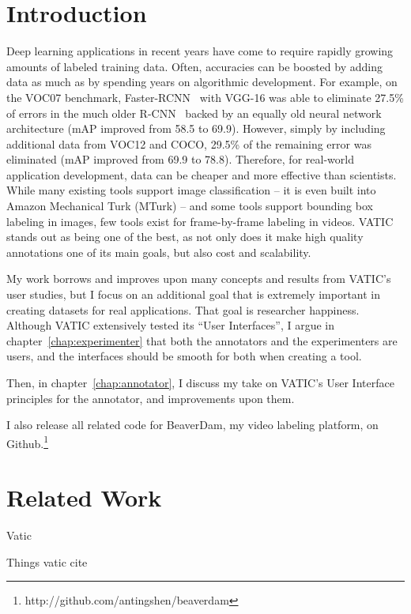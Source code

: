 \section{Introduction}
\label{sec:introduction}

Deep learning applications in recent years have come to require rapidly growing amounts of labeled training data.
Often, accuracies can be boosted by adding data as much as by spending years on algorithmic development.
For example, on the VOC07 benchmark, Faster-RCNN~\cite{FasterRCNN} with VGG-16 was able to eliminate 27.5\% of errors in the much older R-CNN~\cite{RCNN} backed by an equally old neural network architecture (mAP improved from 58.5 to 69.9). 
However, simply by including additional data from VOC12 and COCO, 29.5\% of the remaining error was eliminated (mAP improved from 69.9 to 78.8). 
Therefore, for real-world application development, data can be cheaper and more effective than scientists. 
While many existing tools support image classification -- it is even built into Amazon Mechanical Turk (MTurk) -- and some tools support bounding box labeling in images, few tools exist for frame-by-frame labeling in videos. 
VATIC~\cite{Vatic} stands out as being one of the best, as not only does it make high quality annotations one of its main goals, but also cost and scalability. 

My work borrows and improves upon many concepts and results from VATIC's user studies, but I focus on an additional goal that is extremely important in creating datasets for real applications. That goal is researcher happiness.
Although VATIC extensively tested its ``User Interfaces'', I argue in chapter~\ref{chap:experimenter} that both the annotators and the experimenters are users, and the interfaces should be smooth for both when creating a tool.

Then, in chapter~\ref{chap:annotator}, I discuss my take on VATIC's User Interface principles for the annotator, and improvements upon them.

I also release all related code for BeaverDam, my video labeling platform, on Github.\footnote{http://github.com/antingshen/beaverdam}

\section{Related Work}
\label{sec:related}

Vatic

Things vatic cite
